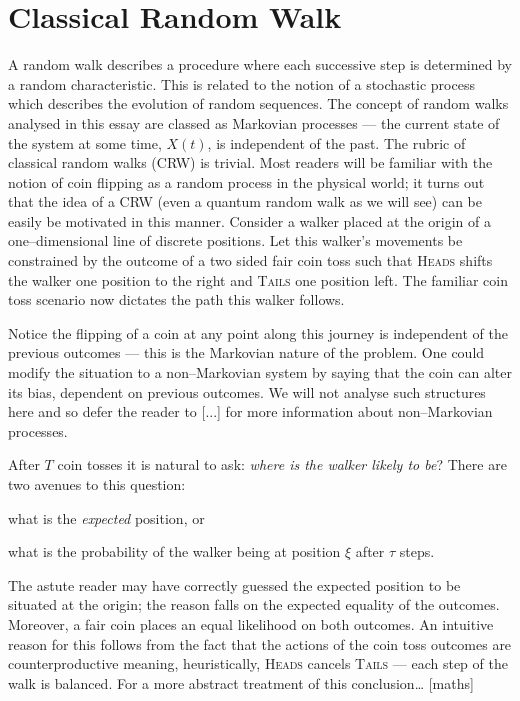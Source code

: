 \documentclass{article}
\begin{document}
\section{Classical Random Walk}
A random walk describes a procedure where each successive step is determined by a random characteristic. This is related to the notion of a stochastic process which describes the evolution of random sequences. The concept of random walks analysed in this essay are classed as Markovian processes --- the current state of the system at some time, $X(t)$, is independent of the past. The rubric of classical random walks (CRW) is trivial. Most readers will be familiar with the notion of coin flipping as a random process in the physical world; it turns out that the idea of a CRW (even a quantum random walk as we will see) can be easily be motivated in this manner. Consider a walker placed at the origin of a one--dimensional line of discrete positions. Let this walker’s movements be constrained by the outcome of a two sided fair coin toss such that \textsc{Heads} shifts the walker one position to the right and \textsc{Tails} one position left. The familiar coin toss scenario now dictates the path this walker follows. 

Notice the flipping of a coin at any point along this journey is independent of the previous outcomes --- this is the Markovian nature of the problem. One could modify the situation to a non--Markovian system by saying that the coin can alter its bias, dependent on previous outcomes. We will not analyse such structures here and so defer the reader to [...] for more information about non--Markovian processes. 

After $T$ coin tosses it is natural to ask: \emph{where is the walker likely to be}? There are two avenues to this question: \begin{inparaenum}[(a)]\item what is the \emph{expected} position, or \item what is the probability of the walker being at position $\xi$ after $\tau$ steps. \end{inparaenum} The astute reader may have correctly guessed the expected position to be situated at the origin; the reason falls on the expected equality of the outcomes. Moreover, a fair coin places an equal likelihood on both outcomes. An intuitive reason for this follows from the fact that the actions of the coin toss outcomes are counterproductive meaning, heuristically, \textsc{Heads} cancels \textsc{Tails} --- each step of the walk is balanced. For a more abstract treatment of this conclusion… [maths]
\end{document}
